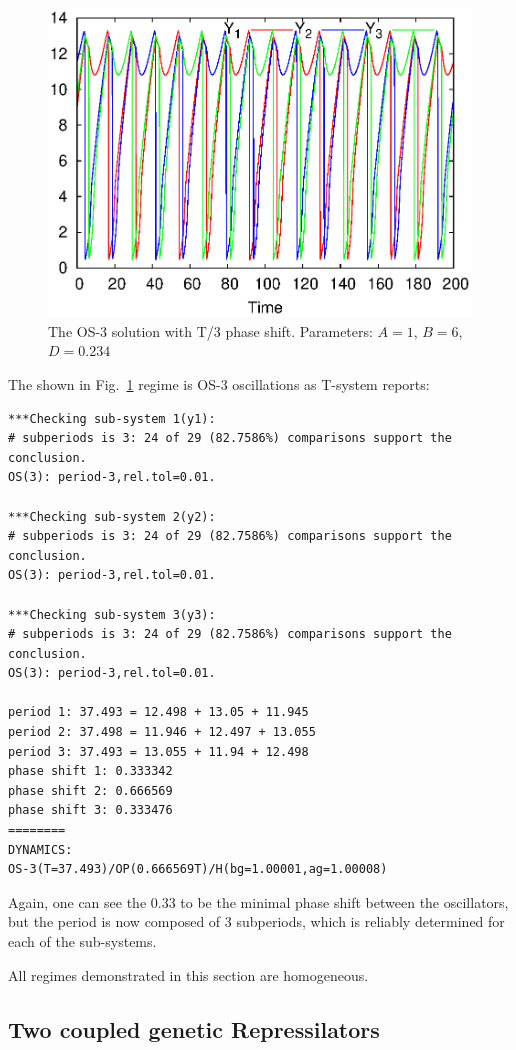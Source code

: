 \documentclass[11pt,a4paper]{article}
\begin{document}
\begin{figure}[h]
  \centering
  \includegraphics[scale=0.6]{br3_os3}
  \caption{The OS-3 solution with T/3 phase shift. Parameters: $A=1$, $B=6$, $D=0.234$}
  \label{fig:br3_os3}
\end{figure}

The shown in Fig.~\ref{fig:br3_os3} regime is OS-3 oscillations as T-system reports:
\begin{verbatim}
***Checking sub-system 1(y1):
# subperiods is 3: 24 of 29 (82.7586%) comparisons support the conclusion.
OS(3): period-3,rel.tol=0.01.

***Checking sub-system 2(y2):
# subperiods is 3: 24 of 29 (82.7586%) comparisons support the conclusion.
OS(3): period-3,rel.tol=0.01.

***Checking sub-system 3(y3):
# subperiods is 3: 24 of 29 (82.7586%) comparisons support the conclusion.
OS(3): period-3,rel.tol=0.01.

period 1: 37.493 = 12.498 + 13.05 + 11.945
period 2: 37.498 = 11.946 + 12.497 + 13.055
period 3: 37.493 = 13.055 + 11.94 + 12.498
phase shift 1: 0.333342
phase shift 2: 0.666569
phase shift 3: 0.333476
========
DYNAMICS:
OS-3(T=37.493)/OP(0.666569T)/H(bg=1.00001,ag=1.00008)
\end{verbatim}

Again, one can see the 0.33 to be the minimal phase shift between the oscillators,
but the period is now composed of 3 subperiods, which is reliably determined for each
of the sub-systems.

All regimes demonstrated in this section are homogeneous.

\subsection{Two coupled genetic Repressilators}
\label{sec:two-coupled-genetic}
\end{document}
